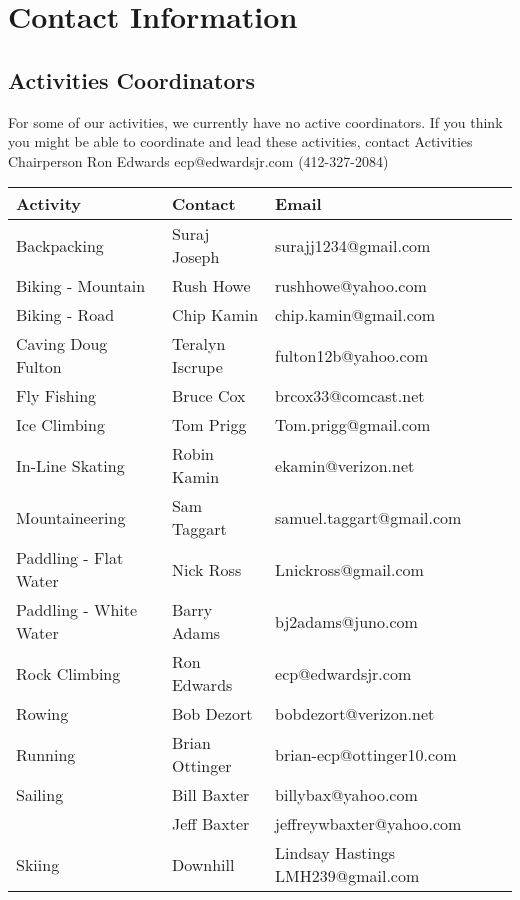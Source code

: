 \documentclass[10pt,a4paper]{article}
\begin{document}
\pagebreak
\clearpage

\appendix

\section{Contact Information}

\subsection{Activities Coordinators}
For some of our activities, we currently have no active coordinators. If you think you might be able to coordinate
and lead these activities, contact Activities Chairperson Ron Edwards ecp@edwardsjr.com (412-327-2084)


\begin{center}
    \begin{tabular}{ | l | l | l | }
    \hline
    \textbf{Activity} & \textbf{Contact} & \textbf{Email} \\\hline
	Backpacking & Suraj Joseph & surajj1234@gmail.com \\ \hline
	Biking - Mountain & Rush Howe & rushhowe@yahoo.com \\ \hline
	Biking - Road & Chip Kamin & chip.kamin@gmail.com \\ \hline
    Caving Doug Fulton & Teralyn Iscrupe & fulton12b@yahoo.com\\ \hline
    Fly Fishing & Bruce Cox & brcox33@comcast.net\\ \hline
    Ice Climbing & Tom Prigg & Tom.prigg@gmail.com\\ \hline
    In-Line Skating & Robin Kamin & ekamin@verizon.net\\ \hline
    Mountaineering & Sam Taggart & samuel.taggart@gmail.com\\ \hline
    Paddling - Flat Water & Nick Ross & Lnickross@gmail.com\\ \hline
    Paddling - White Water & Barry Adams & bj2adams@juno.com\\ \hline
    Rock Climbing & Ron Edwards & ecp@edwardsjr.com\\ \hline
    Rowing & Bob Dezort & bobdezort@verizon.net\\ \hline
    Running & Brian Ottinger &  brian-ecp@ottinger10.com\\ \hline
    Sailing & Bill Baxter & billybax@yahoo.com\\ \hline
		   &  Jeff Baxter& jeffreywbaxter@yahoo.com\\ \hline
	Skiing & Downhill  &  Lindsay Hastings LMH239@gmail.com\\ \hline

\end{tabular}
\end{center}
\end{document}
